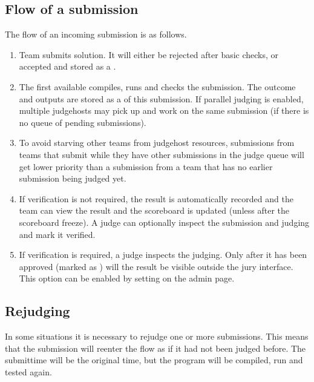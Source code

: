 \documentclass[a4paper,10pt,english,openany]{sphinxmanual}
\begin{document}
\subsection{Flow of a submission}
\label{\detokenize{judging:flow-of-a-submission}}
\sphinxAtStartPar
The flow of an incoming submission is as follows.
\begin{enumerate}
%
\item {} 
\sphinxAtStartPar
Team submits solution. It will either be rejected after basic
checks, or accepted and stored as a .

\item {} 
\sphinxAtStartPar
The first available  compiles, runs and checks
the submission. The outcome and outputs are stored as a
 of this submission. If parallel judging is enabled,
multiple judgehosts may pick up and work on the same submission
(if there is no queue of pending submissions).

\item {} 
\sphinxAtStartPar
To avoid starving other teams from judgehost resources,
submissions from teams that submit while they have other submissions
in the judge queue will get lower priority than a submission from a team that has no earlier submission being judged yet.

\item {} 
\sphinxAtStartPar
If verification is not required, the result is automatically
recorded and the team can view the result and the scoreboard is
updated (unless after the scoreboard freeze). A judge can
optionally inspect the submission and judging and mark it
verified.

\item {} 
\sphinxAtStartPar
If verification is required, a judge inspects the judging. Only
after it has been approved (marked as ) will
the result be visible outside the jury interface. This option
can be enabled by setting  on
the  admin page.

\end{enumerate}


\subsection{Rejudging}
\label{\detokenize{judging:rejudging}}\label{\detokenize{judging:id1}}
\sphinxAtStartPar
In some situations it is necessary to rejudge one or more submissions. This means
that the submission will re\sphinxhyphen{}enter the flow as if it had not been
judged before. The submittime will be the original time, but the
program will be compiled, run and tested again.
\end{document}
